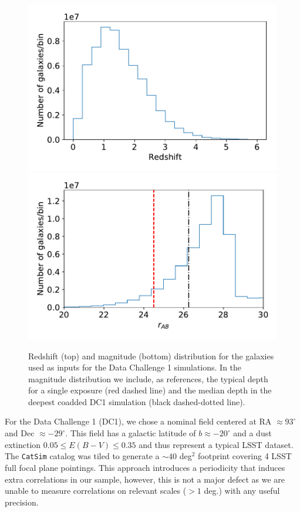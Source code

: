 \documentclass[twocolumn]{aastex62}
\begin{document}
\begin{figure}
\centering
\includegraphics[width=0.9\columnwidth]{N_z_DC1.pdf}
\includegraphics[width=0.9\columnwidth]{N_m_DC1.pdf}
\caption{Redshift (top) and magnitude (bottom) distribution for the galaxies used as inputs for the Data Challenge 1 simulations. In the magnitude distribution we include, as references, the typical depth for a single exposure (red dashed line) and the median depth in the deepest coadded DC1 simulation (black dashed-dotted line).}
\label{fig:catalog_plots}
\end{figure}


For the Data Challenge 1 (DC1), we chose a nominal field centered at RA $\approx 93^{\circ}$ and Dec $\approx -29^{\circ}$. This field has a galactic latitude of $b \approx -20^{\circ}$ and a dust extinction $0.05 \leq E(B-V) \leq 0.35$ and thus represent a typical LSST dataset. The \texttt{CatSim} catalog was tiled to generate a $\sim 40$ deg$^{2}$ footprint covering 4 LSST full focal plane pointings. This approach introduces a periodicity that induces extra correlations in our sample, however, this is not a major defect as we are unable to measure correlations on relevant scales ($> 1$ deg.) with any useful precision.
\end{document}
